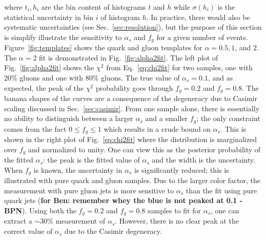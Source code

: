\noindent where $t_i, h_i$ are the bin content of histograms $t$ and $h$ while $\sigma(h_i)$ is the statistical uncertainty in bin $i$ of histogram $h$.  In practice, there would also be systematic uncertainties (see Sec.~\ref{sec:resolution}), but the purpose of this section is simplify illustrate the sensitivity to $\alpha_s$ and $f_g$ for a given number of events.  Figure~\ref{fig:templates} shows the quark and gluon templates for $\alpha=0.5, 1$, and $2$.  The $\alpha=2$ fit is demonstrated in Fig.~\ref{fig:alpha2fit}.  The left plot of Fig.~\ref{fig:alpha2fit} shows the $\chi^2$ from Eq.~\ref{eq:chi2fit} for two samples, one with 20\% gluons and one with 80\% gluons.  The true value of $\alpha_s=0.1$, and as expected, the peak of the $\chi^2$ probability goes through $f_g=0.2$ and $f_g=0.8$.  The banana shapes of the curves are a consequence of the degeneracy due to Casimir scaling discussed in Sec.~\ref{sec:casimir}.  From one sample alone, there is essentially no ability to distinguish between a larger $\alpha_s$ and a smaller $f_g$; the only constraint comes from the fact $0\leq f_g\leq 1$ which results in a crude bound on $\alpha_s$.  This is shown in the right plot of Fig.~\ref{eq:chi2fit} where the distribution is marginalized over $f_g$ and normalized to unity.  One can view this as the posterior probability of the fitted $\alpha_s$: the peak is the fitted value of $\alpha_s$ and the width is the uncertainty.  When $f_g$ is known, the uncertainty in $\alpha_s$ is significantly reduced; this is illustrated with pure quark and gluon samples.  Due to the larger color factor, the measurement with pure gluon jets is more sensitive to $\alpha_s$ than the fit using pure quark jets (\textbf{for Ben: remember whey the blue is not peaked at 0.1 -BPN}).  Using both the $f_g=0.2$ and $f_g=0.8$ samples to fit for $\alpha_s$, one can extract a $\sim 30\%$ measurement of $\alpha_s$.  However, there is no clear peak at the correct value of $\alpha_s$ due to the Casimir degeneracy.  

